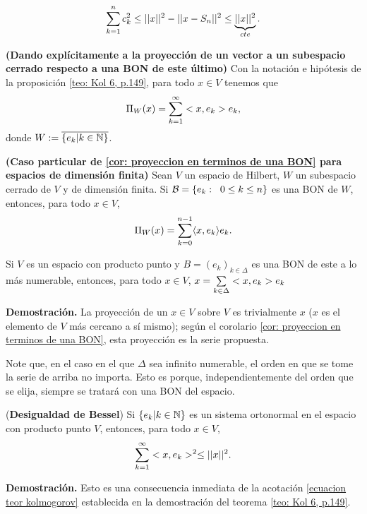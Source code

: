 \begin{equation} \label{ecuacion teor kolmogorov}
\sum\limits_{k=1}^{n}c_{k}^{2} \leq ||x||^{2}-||x-S_{n}||^{2} \leq 
\underbrace{||x||^{2}}_{cte}.
\end{equation}

\QEDB
\vspace{0.2cm}


\begin{cor} \label{cor: proyeccion en terminos de una BON}
\textbf{(Dando explícitamente a la proyección de un vector
a un subespacio cerrado respecto a una BON de este último)}
Con la notación 
e hipótesis
de la proposición \ref{teo: Kol 6, p.149},
para todo $x \in V$
tenemos que
\[
\Pi_{W}(x) = \sum\limits_{k=1}^{\infty}<x, e_{k}>e_{k},
\]
donde $W := \overline{\{e_{k}| k \in \mathbb{N} \}}$. 
\end{cor}

\begin{cor}
\label{cor: proyeccion en terminos de BON}
\textbf{(Caso particular de \ref{cor: proyeccion en terminos de una BON} para
espacios de dimensión finita)}
Sean $V$ un espacio de Hilbert, $W$ un subespacio cerrado de $V$
y de dimensión finita. Si 
$\mathcal{B} = \{ e_{k}: \hspace{0.2cm} 0 \leq k \leq n \}$
es una BON de $W$, entonces, para todo $x \in V$,
\[
\Pi_{W}(x) = \sum\limits_{k=0}^{n-1} \langle x, e_{k} \rangle e_{k}.
\]  
\end{cor}


\begin{cor} \label{cor: representacion de un vector respecto a una BON}
Si $V$ es un espacio con producto punto 
y $B=(e_{k})_{k \in \Delta}$ es una BON de este
a lo más numerable, entonces, para todo
$x \in V$, $x = \sum\limits_{k \in \Delta}^{}<x, e_{k}>e_{k}$
\end{cor}
\noindent
\textbf{Demostración.}
La proyección de un $x \in V$ sobre $V$ es trivialmente $x$
($x$ es el elemento de $V$ más cercano a sí mismo); según el corolario
\ref{cor: proyeccion en terminos de una BON}, esta
proyección es la serie propuesta. \QEDB
\vspace{0.2cm}

Note que, en el caso en el que $\Delta$ sea infinito numerable,
el orden en que se tome la serie de arriba no importa. Esto es porque,
independientemente del orden que se elija, siempre se tratará con
una BON del espacio. \\

\begin{cor}(\textbf{Desigualdad de Bessel})
Si $\{ e_{k} | k \in \mathbb{N} \}$ es un sistema ortonormal en 
el espacio con producto punto $V$, entonces, para todo $x \in V$,
\[
\sum\limits_{k=1}^{\infty}<x , e_{k} >^{2} \leq ||x||^{2}.
\]
\end{cor}
\noindent
\textbf{Demostración.}
Esto es una consecuencia inmediata de la acotación
\eqref{ecuacion teor kolmogorov} establecida en la demostración
del teorema \ref{teo: Kol 6, p.149}.
\QEDB
\vspace{0.2cm}



